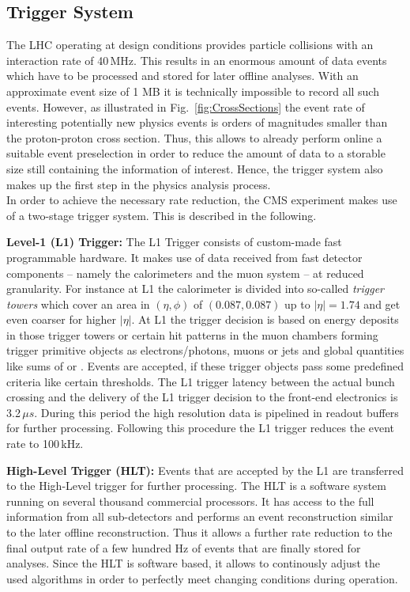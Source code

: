 \subsection{Trigger System}
\label{subsec:cms_trigger}
The LHC operating at design conditions provides particle collisions with an interaction rate of 40\,MHz. This results in an enormous amount of data events which have to be processed and stored for later offline analyses. With an approximate event size of 1 MB it is technically impossible to record all such events. However, as illustrated in Fig.~\ref{fig:CrossSections} the event rate of interesting potentially new physics events is orders of magnitudes smaller than the proton-proton cross section. Thus, this allows to already perform online a suitable event preselection in order to reduce the amount of data to a storable size still containing the information of interest. Hence, the trigger system also makes up the first step in the physics analysis process.\\
In order to achieve the necessary rate reduction, the CMS experiment makes use of a two-stage trigger system. This is described in the following.
\begin{description}
\item \textbf{Level-1 (L1) Trigger:} The L1 Trigger consists of custom-made fast programmable hardware. It makes use of data received from fast detector components -- namely the calorimeters and the muon system -- at reduced granularity. For instance at L1 the calorimeter is divided into so-called \textit{trigger towers} which cover an area in $(\eta, \phi)$ of $(0.087, 0.087)$ up to $|\eta| = 1.74$ and get even coarser for higher $|\eta|$. At L1 the trigger decision is based on energy deposits in those trigger towers or certain hit patterns in the muon chambers forming trigger primitive objects as electrons/photons, muons or jets and global quantities like sums of \et or \met. Events are accepted, if these trigger objects pass some predefined criteria like certain \pt thresholds. The L1 trigger latency between the actual bunch crossing and the delivery of the L1 trigger decision to the front-end electronics is 3.2\,$\mu s$. During this period the high resolution data is pipelined in readout buffers for further processing. Following this procedure the L1 trigger reduces the event rate to 100\,kHz.
\item \textbf{High-Level Trigger (HLT):} Events that are accepted by the L1 are transferred to the High-Level trigger for further processing. The HLT is a software system running on several thousand commercial processors. It has access to the full information from all sub-detectors and performs an event reconstruction similar to the later offline reconstruction. Thus it allows a further rate reduction to the final output rate of a few hundred Hz of events that are finally stored for analyses. Since the HLT is software based, it allows to continously adjust the used algorithms in order to perfectly meet changing conditions during operation.
\end{description}


